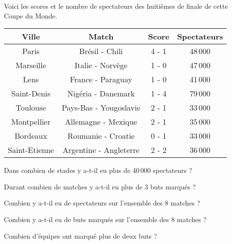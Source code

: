 Voici les scores et le nombre de spectateurs des huitièmes de finale
de cette Coupe du Monde.
\begin{center}
\begin{tabular}{|c|c|c|c|}
\hline
{\bf Ville}&{\bf Match}&{\bf Score}&{\bf Spectateurs}\\
\hline
Paris&Brésil - Chili&4 - 1&48\,000\\
\hline
Marseille&Italie - Norvège&1 - 0&47\,000\\
\hline
Lens&France - Paraguay&1 - 0&41\,000\\
\hline
Saint-Denis&Nigéria - Danemark&1 - 4&79\,000\\
\hline
Toulouse&Pays-Bas - Yougoslavie&2 - 1&33\,000\\
\hline
Montpellier&Allemagne - Mexique&2 - 1&35\,000\\
\hline
Bordeaux&Roumanie - Croatie&0 - 1&33\,000\\
\hline
Saint-Etienne&Argentine - Angleterre&2 - 2&36\,000\\
\hline
\end{tabular}
\end{center}
\begin{myenumerate}
\item Dans combien de stades y a-t-il eu plus de 40\,000 spectateurs ?
\item Durant combien de matches y a-t-il eu plus de 3 buts marqués ?
\item Combien y a-t-il eu de spectateurs sur l'ensemble des 8 matches ?
\item Combien y a-t-il eu de buts marqués sur l'ensemble des 8 matches ?
\item Combien d'équipes ont marqué plus de deux buts ?
\end{myenumerate}